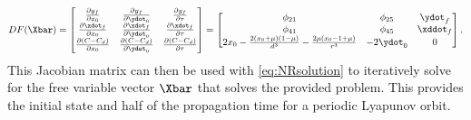 \begin{equation}
    DF(\Xbar)=\begin{bmatrix}   \frac{\partial y_{f}}{\partial x_{0}}                                       &   \frac{\partial y_{f}}{\partial\ydot_{0}}    &   \frac{\partial y_{f}}{\partial\tau}     \\
                                \frac{\partial\xdot_{f}}{\partial x_{0}}                                    &   \frac{\partial\xdot_{f}}{\partial\ydot_{0}} &   \frac{\partial\xdot_{f}}{\partial\tau}  \\
                                \frac{\partial(C-C_{d})}{\partial x_{0}}                                    &   \frac{\partial(C-C_{d})}{\partial\ydot_{0}} &   \frac{\partial(C-C_{d})}{\partial\tau}  \end{bmatrix}
             =\begin{bmatrix}   \phi_{21}                                                                   &   \phi_{25}                                   &   \ydot_{f}                               \\
                                \phi_{41}                                                                   &   \phi_{45}                                   &   \xddot_{f}                              \\
                                2x_{0}-\frac{2(x_{0}+\mu)(1-\mu)}{d^{3}}-\frac{2\mu(x_{0}-1+\mu)}{r^{3}}    &   -2\ydot_{0}                                 &   0                                       \end{bmatrix}.
\end{equation}
This Jacobian matrix can then be used with \cref{eq:NRsolution} to iteratively solve for the free
variable vector $\Xbar$ that solves the provided problem. This provides the initial state and half
of the propagation time for a periodic Lyapunov orbit.

